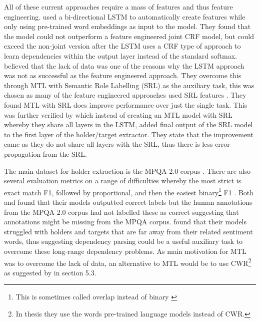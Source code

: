 All of these current approaches require a mass of features and thus feature engineering. \citet{katiyar-cardie-2016-investigating} used a bi-directional LSTM to automatically create features while only using pre-trained word embeddings as input to the model. They found that the model could not outperform a feature engineered joint CRF model, but could exceed the non-joint version after the LSTM uses a CRF type of approach to learn dependencies within the output layer instead of the standard softmax. \citet{marasovic-frank-2018-srl4orl} believed that the lack of data was one of the reasons why the LSTM approach was not as successful as the feature engineered approach. They overcome this through MTL with Semantic Role Labelling (SRL) as the auxiliary task, this was chosen as many of the feature engineered approaches used SRL features \citep{choi-etal-2005-identifying, johansson-moschitti-2010-reranking, yang-cardie-2013-joint}. They found MTL with SRL does improve performance over just the single task. This was further verified by \citet{zhang-etal-2019-enhancing} which instead of creating an MTL model with SRL whereby they share all layers in the LSTM, added final output of the SRL model to the first layer of the holder/target extractor. They state that the improvement came as they do not share all layers with the SRL, thus there is less error propagation from the SRL. 

The main dataset for holder extraction is the MPQA 2.0 corpus \citep{wiebe2005annotating}. There are also several evaluation metrics on a range of difficulties whereby the most strict is exact match F1, followed by proportional, and then the easiest binary\footnote{This is sometimes called overlap instead of binary \cite{choi-etal-2005-identifying, choi-etal-2006-joint}} F1 \citep{zhang-etal-2019-enhancing,marasovic-frank-2018-srl4orl,katiyar-cardie-2016-investigating}. Both \citet{katiyar-cardie-2016-investigating} and \citet{marasovic-frank-2018-srl4orl} found that their models outputted correct labels but the human annotations from the MPQA 2.0 corpus had not labelled these as correct suggesting that annotations might be missing from the MPQA corpus. \citet{marasovic-frank-2018-srl4orl} found that their models struggled with holders and targets that are far away from their related sentiment words, thus suggesting dependency parsing could be a useful auxiliary task to overcome these long-range dependency problems. As \citet{marasovic-frank-2018-srl4orl} main motivation for MTL was to overcome the lack of data, an alternative to MTL would be to use CWR\footnote{In \citet{marasovic2020deep} thesis they use the words pre-trained language models instead of CWR.} as suggested by \citet{marasovic2020deep} in section 5.3.

